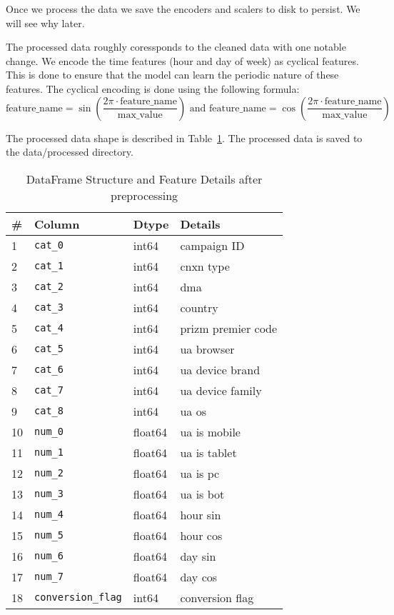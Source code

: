 \documentclass[11pt]{article}
\begin{document}
Once we process the data we save the encoders and scalers to disk to persist. We will see why later. 

The processed data roughly coressponds to the cleaned data with one notable change. We encode the time features
 (hour and day of week) as cyclical features. This is done to ensure that the model can learn the periodic nature of these features.
The cyclical encoding is done using the following formula:
\[
  \text{feature\_name} = \sin\left(\frac{2\pi \cdot \text{feature\_name}}{\text{max\_value}}\right)
  \text{ and } 
  \text {feature\_name} = \cos\left(\frac{2\pi \cdot \text{feature\_name}}{\text{max\_value}}\right)
\]

The processed data shape is described in Table~\ref{tab:data_columns_processed}.
The processed data is saved to the data/processed directory.
\begin{table}[H]
  \centering
  \caption{DataFrame Structure and Feature Details after preprocessing}
  \label{tab:data_columns_processed}
  \begin{tabular}{ll@{\quad\quad}l@{\quad\quad\quad}l}
  \toprule
  \# & \textbf{Column} & \textbf{Dtype} & \textbf{Details} \\
  \midrule
  1 & \texttt{cat\_0} & int64 & campaign ID \\
  2 & \texttt{cat\_1} & int64 & cnxn type \\
  3 & \texttt{cat\_2} & int64 & dma \\
  4 & \texttt{cat\_3} & int64 & country \\
  5 & \texttt{cat\_4} & int64 & prizm premier code \\
  6 & \texttt{cat\_5} & int64 & ua browser \\
  7 & \texttt{cat\_6} & int64 & ua device brand \\
  8 & \texttt{cat\_7} & int64 & ua device family \\
  9 & \texttt{cat\_8} & int64 & ua os \\
  \midrule
  10 & \texttt{num\_0} & float64 & ua is mobile \\
  11 & \texttt{num\_1} & float64 & ua is tablet \\
  12 & \texttt{num\_2} & float64 & ua is pc \\
  13 & \texttt{num\_3} & float64 & ua is bot \\
  14 & \texttt{num\_4} & float64 & hour sin \\
  15 & \texttt{num\_5} & float64 & hour cos \\
  16 & \texttt{num\_6} & float64 & day sin \\
  17 & \texttt{num\_7} & float64 & day cos \\
  \midrule
  18 & \texttt{conversion\_flag} & int64 & conversion flag \\
  \bottomrule
  \end{tabular}
\end{table}
\end{document}
